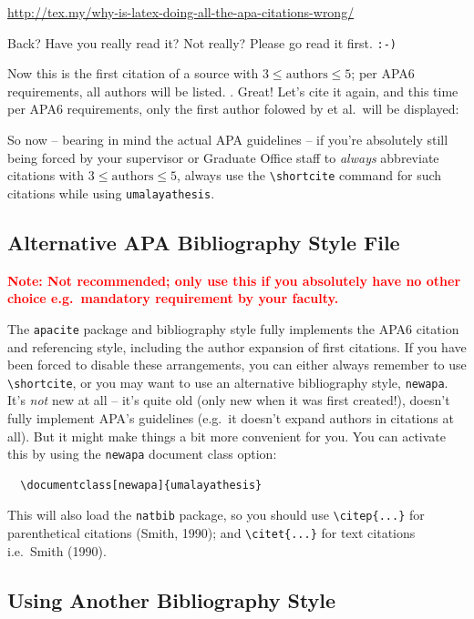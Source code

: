 \url{http://tex.my/why-is-latex-doing-all-the-apa-citations-wrong/}

Back? Have you really read it? Not really? Please go read it first. \texttt{:-)}

Now this is the first citation of a source with $3 \leq \text{authors} \leq 5$; per APA6 requirements, all authors will be listed. \cite{azarova:etal:2002}. Great! Let's cite it again, and this time per APA6 requirements, only the first author folowed by et al.~will be displayed: \cite{azarova:etal:2002}

So now -- bearing in mind the actual APA guidelines -- if you're absolutely still being forced by your supervisor or Graduate Office staff to \emph{always} abbreviate citations with $3 \leq \text{authors} \leq 5$, always use the \verb|\shortcite| command for such citations while using \texttt{umalayathesis}.

\subsection{Alternative APA Bibliography Style File}

\textcolor{red}{\textbf{Note: Not recommended; only use this if you absolutely have no other choice e.g.~mandatory requirement by your faculty.}}

The \texttt{apacite} package and bibliography style fully implements the APA6 citation and referencing style, including the author expansion of first citations. If you have been forced to disable these arrangements, you can either always remember to use \verb|\shortcite|, or you may want to use an alternative bibliography style, \texttt{newapa}. It's \emph{not} new at all -- it's quite old (only new when it was first created!), doesn't fully implement APA's guidelines (e.g.~it doesn't expand authors in citations at all). But it might make things a bit more convenient for you. You can activate this by using the \texttt{newapa} document class option:
\begin{verbatim}
  \documentclass[newapa]{umalayathesis}
\end{verbatim}

This will also load the \texttt{natbib} package, so you should use \verb|\citep{...}| for parenthetical citations (Smith, 1990); and \verb|\citet{...}| for text citations i.e.~Smith (1990).

\subsection{Using Another Bibliography Style}
\label{sec:custombib}

